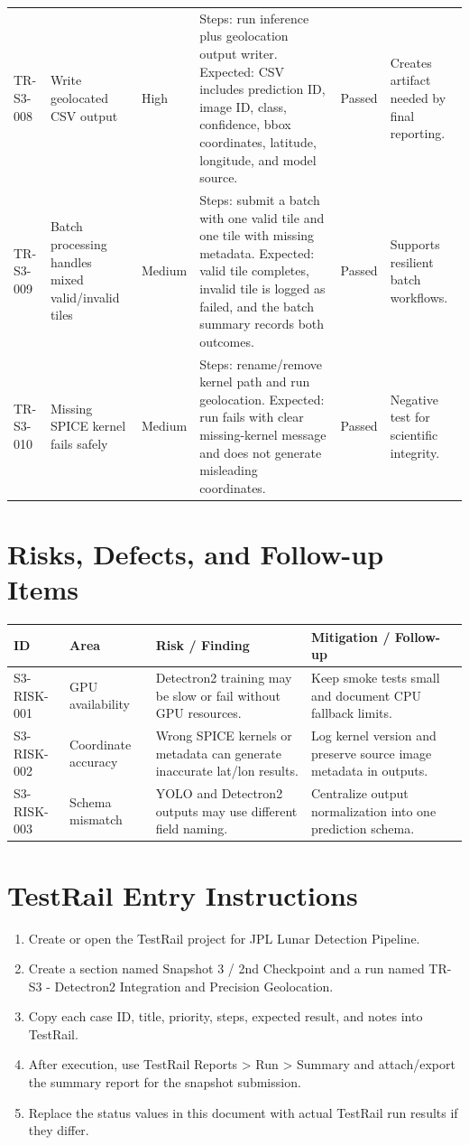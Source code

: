 \documentclass[11pt,landscape]{article}
\begin{document}
\begin{longtable}{p{0.75in}p{1.55in}p{0.65in}p{4.05in}p{0.65in}p{1.35in}}
TR-S3-008 & Write geolocated CSV output & High & Steps: run inference plus geolocation output writer. Expected: CSV includes prediction ID, image ID, class, confidence, bbox coordinates, latitude, longitude, and model source. & Passed & Creates artifact needed by final reporting. \\
TR-S3-009 & Batch processing handles mixed valid/invalid tiles & Medium & Steps: submit a batch with one valid tile and one tile with missing metadata. Expected: valid tile completes, invalid tile is logged as failed, and the batch summary records both outcomes. & Passed & Supports resilient batch workflows. \\
TR-S3-010 & Missing SPICE kernel fails safely & Medium & Steps: rename/remove kernel path and run geolocation. Expected: run fails with clear missing-kernel message and does not generate misleading coordinates. & Passed & Negative test for scientific integrity. \\
\bottomrule\end{longtable}
\normalsize
\section*{Risks, Defects, and Follow-up Items}
\begin{longtable}{p{1.0in}p{1.6in}p{3.8in}p{3.0in}}\toprule\textbf{ID} & \textbf{Area} & \textbf{Risk / Finding} & \textbf{Mitigation / Follow-up}\\\midrule\endhead
S3-RISK-001 & GPU availability & Detectron2 training may be slow or fail without GPU resources. & Keep smoke tests small and document CPU fallback limits. \\
S3-RISK-002 & Coordinate accuracy & Wrong SPICE kernels or metadata can generate inaccurate lat/lon results. & Log kernel version and preserve source image metadata in outputs. \\
S3-RISK-003 & Schema mismatch & YOLO and Detectron2 outputs may use different field naming. & Centralize output normalization into one prediction schema. \\
\bottomrule\end{longtable}
\section*{TestRail Entry Instructions}
\begin{enumerate}[leftmargin=*]
\item Create or open the TestRail project for JPL Lunar Detection Pipeline.
\item Create a section named Snapshot 3 / 2nd Checkpoint and a run named TR-S3 - Detectron2 Integration and Precision Geolocation.
\item Copy each case ID, title, priority, steps, expected result, and notes into TestRail.
\item After execution, use TestRail Reports > Run > Summary and attach/export the summary report for the snapshot submission.
\item Replace the status values in this document with actual TestRail run results if they differ.
\end{enumerate}
\end{document}
